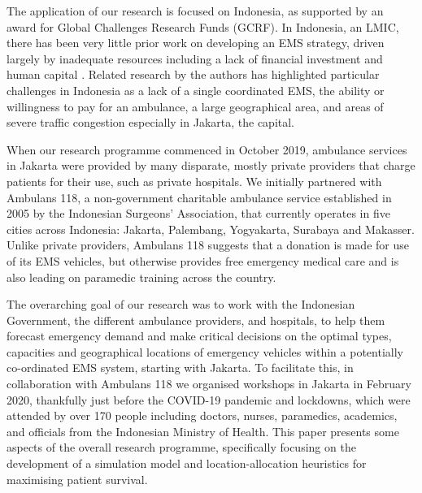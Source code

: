 \documentclass[preprint,12pt]{elsarticle}
\begin{document}
The application of our research is focused on Indonesia, as supported by an award for Global Challenges Research Funds (GCRF). In Indonesia, an LMIC, there has been very little prior work on developing an EMS strategy, driven largely by inadequate resources including a lack of financial investment and human capital \cite{plummer2017ems,pusponegoro2003terrorism,yusvirazi2018state}. Related research by the authors \cite{BriceSyaribahNoor2022Esui} has highlighted particular challenges in Indonesia as a lack of a single coordinated EMS, the ability or willingness to pay for an ambulance, a large geographical area, and areas of severe traffic congestion especially in Jakarta, the capital.  

When our research programme commenced in October 2019, ambulance services in Jakarta were provided by many disparate, mostly private providers that charge patients for their use, such as private hospitals. We initially partnered with Ambulans 118, a non-government charitable ambulance service established in 2005 by the Indonesian Surgeons’ Association, that  currently operates in five cities across Indonesia: Jakarta, Palembang, Yogyakarta, Surabaya and Makasser. Unlike private providers, Ambulans 118 suggests that a donation is made for use of its EMS vehicles, but otherwise provides free emergency medical care and is also leading on paramedic training across the country. 

The overarching goal of our research was to work with the Indonesian Government, the different ambulance providers, and hospitals, to help them forecast emergency demand and make critical decisions on the optimal types, capacities and geographical locations of emergency vehicles within a potentially co-ordinated EMS system, starting with Jakarta. To facilitate this, in collaboration with Ambulans 118 we organised workshops in Jakarta in February 2020, thankfully just before the COVID-19 pandemic and lockdowns, which were attended by over 170 people including doctors, nurses, paramedics, academics, and officials from the Indonesian Ministry of Health. This paper presents some aspects of the overall research programme, specifically focusing on the development of a simulation model and location-allocation heuristics for maximising patient survival.  
\end{document}
